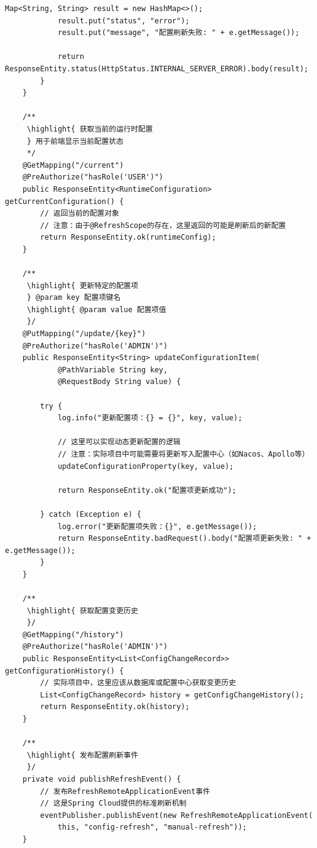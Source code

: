 \begin{lstlisting}[style=java]
            Map<String, String> result = new HashMap<>();
            result.put("status", "error");
            result.put("message", "配置刷新失败: " + e.getMessage());
            
            return ResponseEntity.status(HttpStatus.INTERNAL_SERVER_ERROR).body(result);
        }
    }
    
    /**
     \highlight{ 获取当前的运行时配置
     } 用于前端显示当前配置状态
     */
    @GetMapping("/current")
    @PreAuthorize("hasRole('USER')")
    public ResponseEntity<RuntimeConfiguration> getCurrentConfiguration() {
        // 返回当前的配置对象
        // 注意：由于@RefreshScope的存在，这里返回的可能是刷新后的新配置
        return ResponseEntity.ok(runtimeConfig);
    }
    
    /**
     \highlight{ 更新特定的配置项
     } @param key 配置项键名
     \highlight{ @param value 配置项值
     }/
    @PutMapping("/update/{key}")
    @PreAuthorize("hasRole('ADMIN')")
    public ResponseEntity<String> updateConfigurationItem(
            @PathVariable String key,
            @RequestBody String value) {
        
        try {
            log.info("更新配置项：{} = {}", key, value);
            
            // 这里可以实现动态更新配置的逻辑
            // 注意：实际项目中可能需要将更新写入配置中心（如Nacos、Apollo等）
            updateConfigurationProperty(key, value);
            
            return ResponseEntity.ok("配置项更新成功");
            
        } catch (Exception e) {
            log.error("更新配置项失败：{}", e.getMessage());
            return ResponseEntity.badRequest().body("配置项更新失败: " + e.getMessage());
        }
    }
    
    /**
     \highlight{ 获取配置变更历史
     }/
    @GetMapping("/history")
    @PreAuthorize("hasRole('ADMIN')")
    public ResponseEntity<List<ConfigChangeRecord>> getConfigurationHistory() {
        // 实际项目中，这里应该从数据库或配置中心获取变更历史
        List<ConfigChangeRecord> history = getConfigChangeHistory();
        return ResponseEntity.ok(history);
    }
    
    /**
     \highlight{ 发布配置刷新事件
     }/
    private void publishRefreshEvent() {
        // 发布RefreshRemoteApplicationEvent事件
        // 这是Spring Cloud提供的标准刷新机制
        eventPublisher.publishEvent(new RefreshRemoteApplicationEvent(
            this, "config-refresh", "manual-refresh"));
    }
    

\end{lstlisting}

